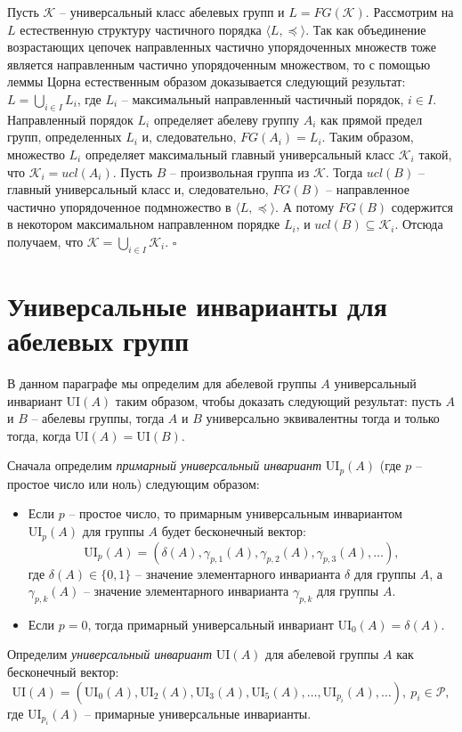 \documentclass[a4paper,11pt,twoside]{article}
\def\proof{{\noindent{\bf Доказательство.}} }
\def\K{{\mathcal{K}}}
\def\P{{\mathcal{P}}}
\def\ui{{\mathrm{UI}}}
\begin{document}
\proof Пусть $\K$ -- универсальный класс абелевых групп и $L = FG(\K)$. Рассмотрим на $L$ естественную структуру частичного порядка $\langle L, \preceq \rangle$. Так как объединение возрастающих цепочек направленных частично упорядоченных множеств тоже является направленным частично упорядоченным множеством, то с помощью леммы Цорна естественным образом доказывается следующий результат: $L = \bigcup\limits_{i \in I} L_i$, где $L_i$ -- максимальный направленный частичный порядок, $i \in I$. Направленный порядок $L_i$ определяет абелеву группу $A_i$ как прямой предел групп, определенных $L_i$ и, следовательно, $FG(A_i) = L_i$. Таким образом, множество $L_i$ определяет максимальный главный универсальный класс $\K_i$ такой, что $\K_i = ucl(A_i)$. Пусть $B$ -- произвольная группа из $\K$. Тогда $ucl(B)$ -- главный универсальный класс и, следовательно, $FG(B)$ -- направленное частично упорядоченное подмножество в $\langle L, \preceq  \rangle$. А потому $FG(B)$ содержится в некотором максимальном направленном порядке $L_i$, и $ucl(B) \subseteq \K_i$. Отсюда получаем, что $\K = \bigcup\limits_{i \in I} \K_i$. $\square$


\section{Универсальные инварианты для абелевых групп}

В данном параграфе мы определим для абелевой группы $A$ универсальный инвариант $\ui(A)$ таким образом, чтобы доказать следующий результат: пусть $A$ и $B$ -- абелевы группы, тогда $A$ и $B$ универсально эквивалентны тогда и только тогда, когда $\ui(A) = \ui(B)$.

Сначала определим \textit{примарный универсальный инвариант} $\ui_p(A)$ (где $p$ -- простое число или ноль) следующим образом: 
\begin{itemize}
\item Если $p$ -- простое число, то примарным универсальным инвариантом $\ui_p(A)$ для группы $A$ будет бесконечный вектор:
$$\ui_p(A) = (\delta(A), \gamma_{p,1}(A), \gamma_{p,2}(A), \gamma_{p,3}(A), \ldots),$$
где $\delta(A) \in \{0,1\}$ -- значение элементарного инварианта $\delta$ для группы $A$, а $\gamma_{p,k}(A)$ -- значение элементарного инварианта $\gamma_{p,k}$ для группы $A$.
\item Если $p = 0$, тогда примарный универсальный инвариант $\ui_0(A) = \delta(A)$.
\end{itemize}

Определим \textit{универсальный инвариант} $\ui(A)$ для абелевой группы $A$ как бесконечный вектор:
$$\ui(A) = (\ui_{0}(A), \ui_{2}(A), \ui_{3}(A),\ui_{5}(A),\ldots, \ui_{p_i}(A), \ldots), \ p_i \in \P,$$
где $\ui_{p_i}(A)$ -- примарные универсальные инварианты.
\end{document}
